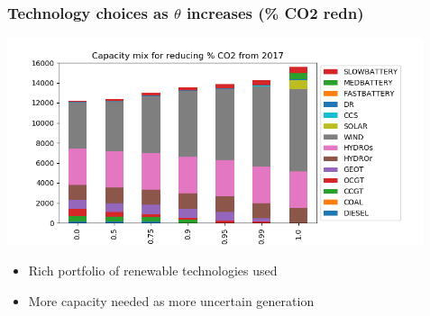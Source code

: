 \documentclass[xcolor=dvipsnames]{beamer}
\begin{document}
\begin{frame}
  \frametitle{Technology choices as $\theta$ increases (\% CO2 redn)}

  \includegraphics[width=4.8in]{includes/Sco2rednv20.png} \\
  \begin{itemize}
  \item Rich portfolio of renewable technologies used
  \item More capacity needed as more uncertain generation
  \end{itemize}
\end{frame}
\end{document}
